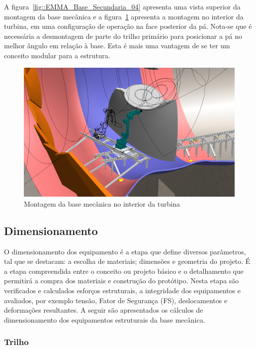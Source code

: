 A figura~\ref{fig::EMMA_Base_Secundaria_04} apresenta uma vista superior da
montagem da base mecânica e a figura~\ref{fig::EMMA_Base_Secundaria_01}
apresenta a montagem no interior da turbina, em uma configuração de operação na
face posterior da pá. Nota-se que é necessária a desmontagem de parte do trilho
primário para posicionar a pá no melhor ângulo em relação à base. Esta é mais
uma vantagem de se ter um conceito modular para a estrutura.

\begin{figure}[h!]
	\centering
	\includegraphics[width=0.9\columnwidth]{method/figs/construcao/EMMA_Base_Secundaria_01}
	\caption{Montagem da base mecânica no interior da turbina}
    \label{fig::EMMA_Base_Secundaria_01}
\end{figure}

\subsection{Dimensionamento}

O dimensionamento dos equipamento é a etapa que define diversos parâmetros, tal
que se destacam: a escolha de materiais; dimensões e geometria do projeto.
É a etapa compreendida entre o conceito ou projeto básico e o detalhamento que
permitirá a compra dos materiais e construção do protótipo. Nesta
etapa são verificados e calculados esforços estruturais, a integridade dos
equipamentos e avaliados, por exemplo tensão, Fator de Segurança (FS),
deslocamentos e deformações resultantes. A seguir são apresentados os cálculos
de dimensionamento dos equipamentos estruturais da base mecânica.

\subsubsection{Trilho}

